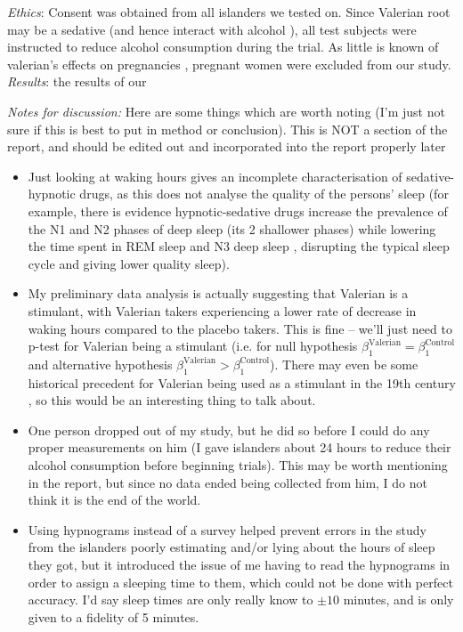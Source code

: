 \documentclass[10pt,preprintnumbers,amsmath,amssymb,floatfix,twocolumn,prl]{revtex4-2}
\begin{document}
\textit{Ethics}: Consent was obtained from all islanders we tested on. Since Valerian root may be a sedative (and hence interact with alcohol \cite{ValerianSource1}), all test subjects were instructed to reduce alcohol consumption during the trial. As little is known of valerian's effects on pregnancies \cite{ValerianSource2}, pregnant women were excluded from our study. \\

\textit{Results}: the results of our

\textit{Notes for discussion:} 
Here are some things which are worth noting (I'm just not sure if this is best to put in method or conclusion). This is NOT a section of the report, and should be edited out and incorporated into the report properly later
\begin{itemize}
\item Just looking at waking hours gives an incomplete characterisation of sedative-hypnotic drugs, as this does not analyse the quality of the persons' sleep (for example, there is evidence hypnotic-sedative drugs increase the prevalence of the N1 and N2 phases of deep sleep (its 2 shallower phases) while lowering the time spent in REM sleep and N3 deep sleep \cite{SleepCyclesSource}, disrupting the typical sleep cycle and giving lower quality sleep).

\item My preliminary data analysis is actually suggesting that Valerian is a stimulant, with Valerian takers experiencing a lower rate of decrease in waking hours compared to the placebo takers. This is fine -- we'll just need to p-test for Valerian being a stimulant (i.e. for null hypothesis $\beta_1^\text{Valerian} = \beta_1^\text{Control}$ and alternative hypothesis $\beta_1^\text{Valerian} > \beta_1^\text{Control}$). There may even be some historical precedent for Valerian being used as a stimulant in the 19th century \cite{ValerianSource2}, so this would be an interesting thing to talk about.

\item One person dropped out of my study, but he did so before I could do any proper measurements on him (I gave islanders about 24 hours to reduce their alcohol consumption before beginning trials). This may be worth mentioning in the report, but since no data ended being collected from him, I do not think it is the end of the world.

\item Using hypnograms instead of a survey helped prevent errors in the study from the islanders poorly estimating and/or lying about the hours of sleep they got, but it introduced the issue of me having to read the hypnograms in order to assign a sleeping time to them, which could not be done with perfect accuracy. I'd say sleep times are only really know to $\pm 10$ minutes, and is only given to a fidelity of 5 minutes.


\end{itemize}
\end{document}
